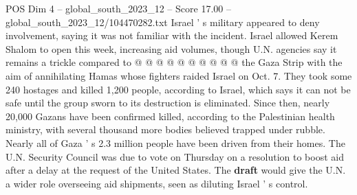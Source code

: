 \begin{textsample}{POS Dim 4 – global\_south\_2023\_12 – Score 17.00 – global\_south\_2023\_12/104470282.txt}
Israel ' s military appeared to deny involvement, saying it was not familiar with the incident.
Israel allowed Kerem Shalom to open this week, increasing aid volumes, though U.N. agencies say it remains a trickle compared to @ @ @ @ @ @ @ @ @ @ the Gaza Strip with the aim of annihilating Hamas whose fighters raided Israel on Oct. 7.
They took some 240 hostages and killed 1,200 people, according to Israel, which says it can not be safe until the group sworn to its destruction is eliminated.
Since then, nearly 20,000 Gazans have been confirmed killed, according to the Palestinian health ministry, with several thousand more bodies believed trapped under rubble.
Nearly all of Gaza ' s 2.3 million people have been driven from their homes.
The U.N.
Security Council was due to vote on Thursday on a resolution to boost aid after a delay at the request of the United States.
The \textbf{draft} would give the U.N. a wider role overseeing aid shipments, seen as diluting Israel ' s control.

\end{textsample}
